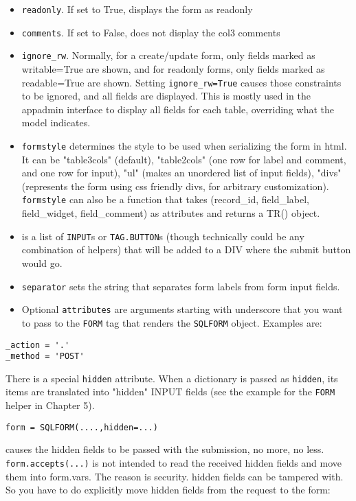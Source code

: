 \documentclass[justified,sixbynine,notoc]{tufte-book}
\def\ft{\small\tt}
\def\inxx#1{\index{#1}}
\begin{document}
\begin{fullwidth}
\begin{itemize}
\item {\ft readonly}. If set to True, displays the form as readonly

\item {\ft comments}. If set to False, does not display the col3 comments

\item {\ft ignore\_rw}. Normally, for a create/update form, only fields marked as writable=True are shown, and for readonly forms, only fields marked as readable=True are shown. Setting {\ft ignore\_rw=True} causes those constraints to be ignored, and all fields are displayed. This is mostly used in the appadmin interface to display all fields for each table, overriding what the model indicates.

\item \inxx{formstyle} {\ft formstyle} determines the style to be used when serializing the form in html. It can be "table3cols" (default), "table2cols" (one row for label and comment, and one row for input), "ul" (makes an unordered list of input fields), "divs" (represents the form using css friendly divs, for arbitrary customization). {\ft formstyle} can also be a function that takes (record\_id, field\_label, field\_widget, field\_comment) as attributes and returns a TR() object.

\item \inxx{buttons} is a list of {\ft INPUT}s or {\ft TAG.BUTTON}s (though technically could be any combination of helpers) that will be added to a DIV where the submit button would go.

\item \inxx{separator} {\ft separator} sets the string that separates form labels from form input fields.

\item Optional {\ft attributes} are arguments starting with underscore that you want to pass to the {\ft FORM} tag that renders the {\ft SQLFORM} object. Examples are:
\end{itemize}
\begin{lstlisting}
_action = '.'
_method = 'POST'
\end{lstlisting}

There is a special {\ft hidden} attribute. When a dictionary is passed as {\ft hidden}, its items are translated into "hidden" INPUT fields (see the example for the {\ft FORM} helper in Chapter 5).

\begin{lstlisting}
form = SQLFORM(....,hidden=...)
\end{lstlisting}
causes the hidden fields to be passed  with the submission, no more, no less.
{\ft form.accepts(...)} is not
intended to read the received hidden fields and move them into
form.vars. The reason is security. hidden fields can be tampered with.
So you have to do explicitly move hidden fields from the request to the form:


\end{fullwidth}
\end{document}
